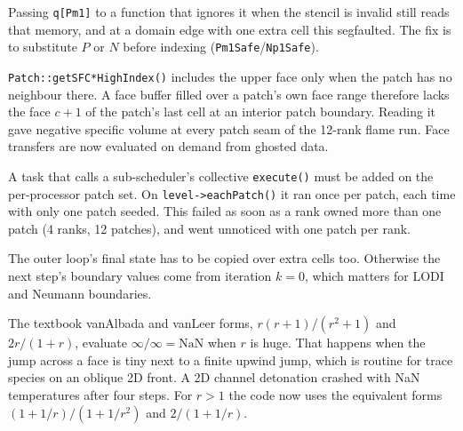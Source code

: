 \documentclass[11pt]{article}
\newcommand{\code}[1]{\texttt{\small #1}}
\begin{document}
\begin{description}[style=nextline, leftmargin=6mm, font=\sffamily\bfseries\color{Ink}]
  \item[Out-of-range stencil arguments]
        Passing \code{q[Pm1]} to a function that ignores it when the stencil is invalid still
        reads that memory, and at a domain edge with one extra cell this segfaulted. The fix is
        to substitute $P$ or $N$ before indexing (\code{Pm1Safe}/\code{Np1Safe}).
  \item[Patch-sized face buffers]
        \code{Patch::getSFC*HighIndex()} includes the upper face only when the patch has no
        neighbour there. A face buffer filled over a patch's own face range therefore lacks
        the face $c+1$ of the patch's last cell at an interior patch boundary. Reading it gave
        negative specific volume at every patch seam of the 12-rank flame run. Face transfers
        are now evaluated on demand from ghosted data.
  \item[Sub-scheduler driver scheduled per patch]
        A task that calls a sub-scheduler's collective \code{execute()} must be added on the
        per-processor patch set. On \code{level->eachPatch()} it ran once per patch, each time
        with only one patch seeded. This failed as soon as a rank owned more than one patch
        (4 ranks, 12 patches), and went unnoticed with one patch per rank.
  \item[Copy-back over interior cells only]
        The outer loop's final state has to be copied over extra cells too. Otherwise
        the next step's boundary values come from iteration $k=0$, which matters for
        LODI and Neumann boundaries.
  \item[Limiter overflow (found in 2D)]
        The textbook vanAlbada and vanLeer forms, $r(r+1)/(r^2+1)$ and $2r/(1+r)$, evaluate
        $\infty/\infty=\mathrm{NaN}$ when $r$ is huge. That happens when the jump across a face is
        tiny next to a finite upwind jump, which is routine for trace species on an oblique 2D
        front. A 2D channel detonation crashed with NaN temperatures after four steps. For $r>1$
        the code now uses the equivalent forms $(1+1/r)/(1+1/r^2)$ and $2/(1+1/r)$.
\end{description}

\end{document}
